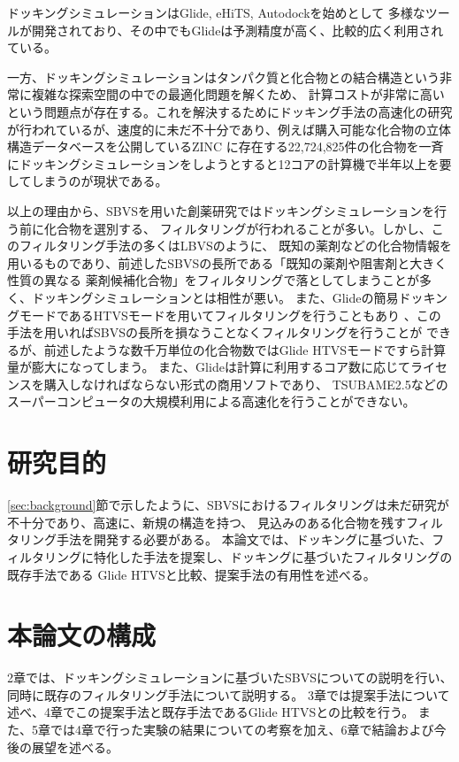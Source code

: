 ドッキングシミュレーションはGlide\cite{Friesner2004}, eHiTS\cite{Zsoldos2007}, Autodock\cite{Morris2009}を始めとして
多様なツールが開発されており、その中でもGlideは予測精度が高く\cite{Kruger2010}、比較的広く利用されている\cite{Yuriev2013}。

一方、ドッキングシミュレーションはタンパク質と化合物との結合構造という非常に複雑な探索空間の中での最適化問題を解くため、
計算コストが非常に高いという問題点が存在する。これを解決するためにドッキング手法の高速化の研究\cite{Kannan2010, McIntosh-Smith2014, Trott2010}
が行われているが、速度的に未だ不十分であり、例えば購入可能な化合物の立体構造データベースを公開しているZINC
\cite{Irwin2005}に存在する22,724,825件の化合物を一斉にドッキングシミュレーションをしようとすると12コアの計算機で半年以上を要してしまうのが現状である。

以上の理由から、SBVSを用いた創薬研究ではドッキングシミュレーションを行う前に化合物を選別する、
フィルタリングが行われることが多い\cite{Nilakantan1993, Parenti2003}。しかし、このフィルタリング手法の多くはLBVSのように、
既知の薬剤などの化合物情報を用いるものであり、前述したSBVSの長所である「既知の薬剤や阻害剤と大きく性質の異なる
薬剤候補化合物」をフィルタリングで落としてしまうことが多く、ドッキングシミュレーションとは相性が悪い。
また、Glideの簡易ドッキングモードであるHTVSモードを用いてフィルタリングを行うこともあり
\cite{Fujimoto2008}、この手法を用いればSBVSの長所を損なうことなくフィルタリングを行うことが
できるが、前述したような数千万単位の化合物数ではGlide HTVSモードですら計算量が膨大になってしまう。
また、Glideは計算に利用するコア数に応じてライセンスを購入しなければならない形式の商用ソフトであり、
TSUBAME2.5などのスーパーコンピュータの大規模利用による高速化を行うことができない。

\section{研究目的}
\ref{sec:background}節で示したように、SBVSにおけるフィルタリングは未だ研究が不十分であり、高速に、新規の構造を持つ、
見込みのある化合物を残すフィルタリング手法を開発する必要がある。
本論文では、ドッキングに基づいた、フィルタリングに特化した手法を提案し、ドッキングに基づいたフィルタリングの既存手法である
Glide HTVSと比較、提案手法の有用性を述べる。

\section{本論文の構成}
2章では、ドッキングシミュレーションに基づいたSBVSについての説明を行い、同時に既存のフィルタリング手法について説明する。
3章では提案手法について述べ、4章でこの提案手法と既存手法であるGlide HTVSとの比較を行う。
また、5章では4章で行った実験の結果についての考察を加え、6章で結論および今後の展望を述べる。